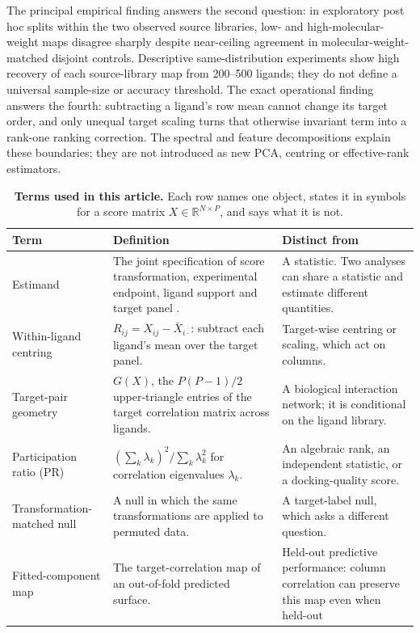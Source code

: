\documentclass[11pt]{article}
\begin{document}
The principal empirical finding answers the second question: in exploratory post hoc splits
within the two observed source libraries, low- and high-molecular-weight maps disagree sharply
despite near-ceiling agreement in molecular-weight-matched disjoint controls. Descriptive
same-distribution experiments show high recovery of each source-library map from 200--500
ligands; they do not define a universal sample-size or accuracy threshold.
The exact operational finding answers the fourth: subtracting a ligand's row mean cannot
change its target order, and only unequal target scaling turns that otherwise invariant term
into a rank-one ranking correction. The spectral and feature decompositions explain these
boundaries; they are not introduced as new PCA, centring or effective-rank estimators.

\begin{table}[t]
\centering\small\singlespacing
\setlength{\tabcolsep}{4pt}
\caption{\textbf{Terms used in this article.} Each row names one object, states it in
symbols for a score matrix $X\in\mathbb{R}^{N\times P}$, and says what it is not.}
\label{tab:glossary}
\begin{tabular}{p{3.0cm}p{5.4cm}p{6.1cm}}
\toprule
Term & Definition & Distinct from \\
\midrule
Estimand &
The joint specification of score transformation, experimental endpoint, ligand support and
target panel \cite{ich2019estimand}. &
A statistic. Two analyses can share a statistic and estimate different quantities. \\
Within-ligand centring &
$R_{ij}=X_{ij}-\bar X_{i\cdot}$: subtract each ligand's mean over the target panel. &
Target-wise centring or scaling, which act on columns. \\
Target-pair geometry &
$G(X)$, the $P(P-1)/2$ upper-triangle entries of the target correlation matrix across
ligands. &
A biological interaction network; it is conditional on the ligand library. \\
Participation ratio (PR) &
$(\sum_k\lambda_k)^2/\sum_k\lambda_k^2$ for correlation eigenvalues $\lambda_k$. &
An algebraic rank, an independent statistic, or a docking-quality score. \\
Transformation-matched null &
A null in which the same transformations are applied to permuted data. &
A target-label null, which asks a different question. \\
Fitted-component map &
The target-correlation map of an out-of-fold predicted surface. &
Held-out predictive performance: column correlation can preserve this map even when held-out

\end{tabular}
\end{table}
\end{document}
